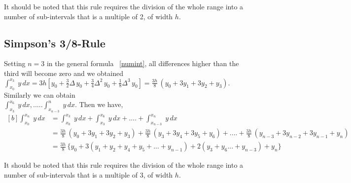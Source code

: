 \documentclass[aima203_lecturenotes_ku.tex]{subfiles}
\begin{document}
\begin{remark}
  It should be noted that this rule requires the division of the whole range into a number of sub-intervals that is a multiple of 2, of width $h$.
\end{remark}

\subsection{Simpson's 3/8-Rule}
Setting $n=3$ in the general formula ~\ref{numint}, all differences higher than the third will become zero and we obtained \\[1mm]
$\displaystyle \int_{x_0}^{x_3} \; y\,dx = 3h \left [ y_0 + \frac{3}{2} \Delta \, y_0 + \frac{3}{4} \Delta^2 \, y_0 + \frac{1}{8} \Delta ^3 \, y_0 \right ] = \frac{3h}{8}\, (y_0 + 3y_1 + 3y_2+y_3).$ \\ Similarly we can obtain \\[5mm] $\int_{x_3}^{x_6} \; y\,dx, ..... \int_{x_{n-3}}^n \; y\,dx $. Then we have,
\begin{equation}
  \label{simp2}
  \begin{aligned}[b]
    \int_{x_0}^{x_n}\; y\,dx &= \int_{x_0}^{x_3} \; y\,dx + \int_{x_3}^{x_6} \; y\,dx + .... + \int_{x_{n-3}}^{x_n} \; y\,dx \\[1mm]
                             &= \frac{3h}{8} \, (y_0 +3y_1 + 3y_2 + y_3) + \frac{3h}{8} \, (y_3 + 3y_4 + 3y_5 + y_6) + .... + \frac{3h}{8} \, (y_{n-3} + 3y_{n-2} + 3y_{n-1} + y_n) \\[1mm]
                             &= \frac{3h}{8} \, \{ y_0 + 3(y_1 + y_2 + y_4 + y_5 + ... + y_{n-1}) + 2 (y_3 + y_6  ... + y_{n-3} ) + y_n \}
  \end{aligned}
\end{equation}
\begin{remark}
  It should be noted that this rule requires the division of the whole range into a number of sub-intervals that is a multiple of 3, of width $h$.
\end{remark}
\end{document}
